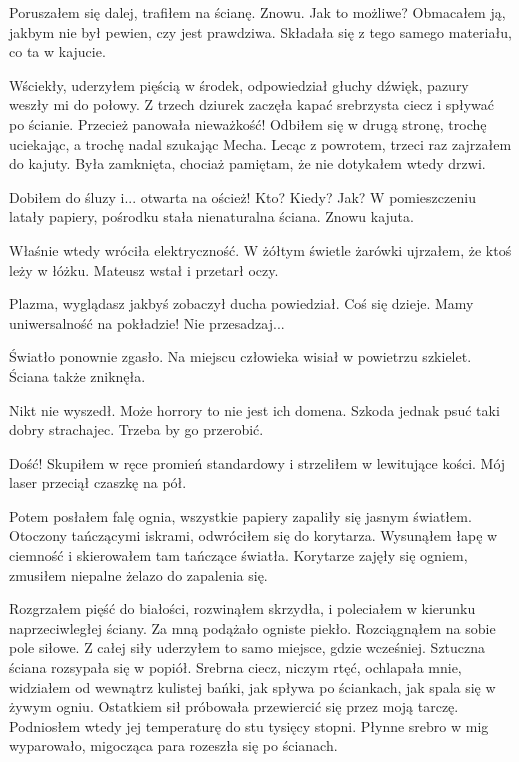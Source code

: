Poruszałem się dalej, trafiłem na ścianę. Znowu. Jak to możliwe?
Obmacałem ją, jakbym nie był pewien, czy jest prawdziwa.
Składała się z tego samego materiału, co ta w kajucie.

Wściekły, uderzyłem pięścią w środek, odpowiedział głuchy dźwięk, pazury weszły mi do połowy.
Z trzech dziurek zaczęła kapać srebrzysta ciecz i spływać po ścianie.
Przecież panowała nieważkość!
Odbiłem się w drugą stronę, trochę uciekając, a trochę nadal szukając Mecha.
Lecąc z powrotem, trzeci raz zajrzałem do kajuty.
Była zamknięta, chociaż pamiętam, że nie dotykałem wtedy drzwi.

Dobiłem do śluzy i... otwarta na oścież!
Kto? Kiedy? Jak?
W pomieszczeniu latały papiery, pośrodku stała nienaturalna ściana. Znowu kajuta.

Właśnie wtedy wróciła elektryczność.
W żółtym świetle żarówki ujrzałem, że ktoś leży w łóżku.
Mateusz wstał i przetarł oczy.
\begin{dialogue}
\ds{} Plazma, wyglądasz jakbyś zobaczył ducha \dm{} powiedział.
\ds{} Coś się dzieje. Mamy uniwersalność na pokładzie!
\ds{} Nie przesadzaj...
\end{dialogue}

Światło ponownie zgasło.
Na miejscu człowieka wisiał w powietrzu szkielet.
Ściana także zniknęła.

\divider{} 

Nikt nie wyszedł. Może horrory to nie jest ich domena. 
Szkoda jednak psuć taki dobry strachajec. 
Trzeba by go przerobić.

\divider{}

Dość!
Skupiłem w ręce promień standardowy i strzeliłem w lewitujące kości.
Mój laser przeciął czaszkę na pół.

Potem posłałem falę ognia, wszystkie papiery zapaliły się jasnym światłem.
Otoczony tańczącymi iskrami, odwróciłem się do korytarza.
Wysunąłem łapę w ciemność i skierowałem tam tańczące światła.
Korytarze zajęły się ogniem, zmusiłem niepalne żelazo do zapalenia się.

Rozgrzałem pięść do białości, rozwinąłem skrzydła, i poleciałem w kierunku naprzeciwległej ściany.
Za mną podążało ogniste piekło.
Rozciągnąłem na sobie pole siłowe.
Z całej siły uderzyłem to samo miejsce, gdzie wcześniej.
Sztuczna ściana rozsypała się w popiół. Srebrna ciecz, niczym rtęć, ochlapała mnie, widziałem od wewnątrz kulistej bańki, jak spływa po ściankach, jak spala się w żywym ogniu.
Ostatkiem sił próbowała przewiercić się przez moją tarczę. Podniosłem wtedy jej temperaturę do stu tysięcy stopni. 
Płynne srebro w mig wyparowało, migocząca para rozeszła się po ścianach.


